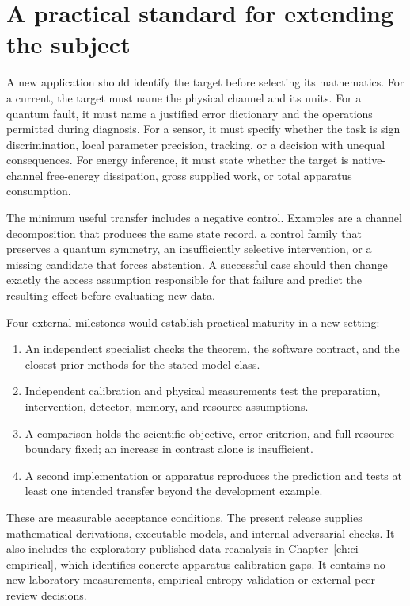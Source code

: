 \section{A practical standard for extending the subject}

A new application should identify the target before selecting its mathematics.
For a current, the target must name the physical channel and its units. For a
quantum fault, it must name a justified error dictionary and the operations
permitted during diagnosis. For a sensor, it must specify whether the task is
sign discrimination, local parameter precision, tracking, or a decision with
unequal consequences. For energy inference, it must state whether the target
is native-channel free-energy dissipation, gross supplied work, or total
apparatus consumption.

The minimum useful transfer includes a negative control. Examples are a
channel decomposition that produces the same state record, a control family
that preserves a quantum symmetry, an insufficiently selective intervention,
or a missing candidate that forces abstention. A successful case should then
change exactly the access assumption responsible for that failure and predict
the resulting effect before evaluating new data.

Four external milestones would establish practical maturity in a new setting:
\begin{enumerate}
\item An independent specialist checks the theorem, the software contract,
and the closest prior methods for the stated model class.
\item Independent calibration and physical measurements test the preparation,
intervention, detector, memory, and resource assumptions.
\item A comparison holds the scientific objective, error criterion, and full
resource boundary fixed; an increase in contrast alone is insufficient.
\item A second implementation or apparatus reproduces the prediction and
tests at least one intended transfer beyond the development example.
\end{enumerate}
These are measurable acceptance conditions. The present release supplies
mathematical derivations, executable models, and internal adversarial checks.
It also includes the exploratory published-data reanalysis in
Chapter~\ref{ch:ci-empirical}, which identifies concrete apparatus-calibration
gaps. It contains no new laboratory measurements, empirical entropy
validation or external peer-review decisions.

